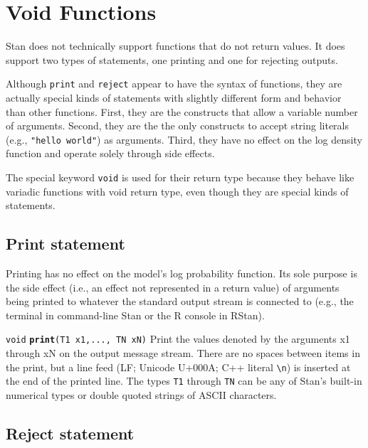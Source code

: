 \documentclass[
  10pt,
]{book}
\begin{document}
\hypertarget{void-functions}{%
\chapter{Void Functions}\label{void-functions}}

Stan does not technically support functions that do not return values.
It does support two types of statements, one printing and one for rejecting
outputs.

Although \texttt{print} and \texttt{reject} appear to have the syntax of functions,
they are actually special kinds of statements with slightly different
form and behavior than other functions. First, they are the
constructs that allow a variable number of arguments. Second, they
are the the only constructs to accept string literals (e.g., \texttt{"hello\ world"}) as arguments. Third, they have no effect on the log density
function and operate solely through side effects.

The special keyword \texttt{void} is used for their return type because they behave
like variadic functions with void return type, even though they are special
kinds of statements.

\hypertarget{print-statement}{%
\section{Print statement}\label{print-statement}}

Printing has no effect on the model's log probability function. Its
sole purpose is the side effect (i.e., an effect not represented in a
return value) of arguments being printed to whatever the standard
output stream is connected to (e.g., the terminal in command-line Stan
or the R console in RStan).


\texttt{void} \textbf{\texttt{print}}\texttt{(T1\ x1,...,\ TN\ xN)}\newline
Print the values denoted by the arguments x1 through xN on the output
message stream. There are no spaces between items in the print, but a
line feed (LF; Unicode U+000A; C++ literal \texttt{\textquotesingle{}\textbackslash{}n\textquotesingle{}}) is inserted at
the end of the printed line. The types \texttt{T1} through \texttt{TN} can be any of
Stan's built-in numerical types or double quoted strings of ASCII
characters.

\hypertarget{reject-statement}{%
\section{Reject statement}\label{reject-statement}}
\end{document}
